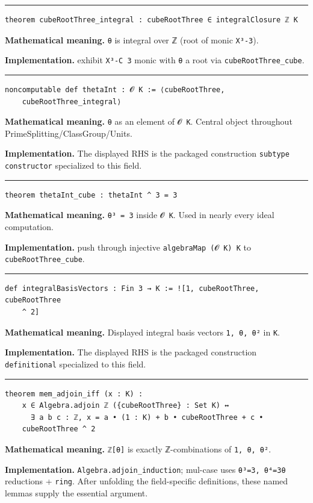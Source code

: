 \documentclass[UTF8,a4paper,11pt,fontset=fandol]{ctexart}
\theoremstyle{definition}
\newcommand{\statementsep}{\par\medskip\hrule\medskip}
\begin{document}
\statementsep
\begin{verbatim}
theorem cubeRootThree_integral : cubeRootThree ∈ integralClosure ℤ K
\end{verbatim}
\noindent\textbf{Mathematical meaning.} \texttt{θ} is integral over ℤ (root of monic \texttt{X³-3}).\par
\noindent\textbf{Implementation.} exhibit \texttt{X³-C 3} monic with \texttt{θ} a root via \texttt{cubeRootThree\_\allowbreak{}cube}.\par
\statementsep
\begin{verbatim}
noncomputable def thetaInt : 𝓞 K := ⟨cubeRootThree,
    cubeRootThree_integral⟩
\end{verbatim}
\noindent\textbf{Mathematical meaning.} \texttt{θ} as an element of \texttt{𝓞 K}. Central object throughout PrimeSplitting/ClassGroup/Units.\par
\noindent\textbf{Implementation.} The displayed RHS is the packaged construction \texttt{subtype constructor} specialized to this field.\par
\statementsep
\begin{verbatim}
theorem thetaInt_cube : thetaInt ^ 3 = 3
\end{verbatim}
\noindent\textbf{Mathematical meaning.} \texttt{θ³ = 3} inside \texttt{𝓞 K}. Used in nearly every ideal computation.\par
\noindent\textbf{Implementation.} push through injective \texttt{algebraMap (𝓞 K) K} to \texttt{cubeRootThree\_\allowbreak{}cube}.\par
\statementsep
\begin{verbatim}
def integralBasisVectors : Fin 3 → K := ![1, cubeRootThree, cubeRootThree
    ^ 2]
\end{verbatim}
\noindent\textbf{Mathematical meaning.} Displayed integral basis vectors \texttt{1, θ, θ²} in \texttt{K}.\par
\noindent\textbf{Implementation.} The displayed RHS is the packaged construction \texttt{definitional} specialized to this field.\par
\statementsep
\begin{verbatim}
theorem mem_adjoin_iff (x : K) :
    x ∈ Algebra.adjoin ℤ ({cubeRootThree} : Set K) ↔
      ∃ a b c : ℤ, x = a • (1 : K) + b • cubeRootThree + c •
    cubeRootThree ^ 2
\end{verbatim}
\noindent\textbf{Mathematical meaning.} \texttt{ℤ[θ]} is exactly ℤ-combinations of \texttt{1, θ, θ²}.\par
\noindent\textbf{Implementation.} \texttt{Algebra.\allowbreak{}adjoin\_\allowbreak{}induction}; mul-case uses \texttt{θ³=3, θ⁴=3θ} reductions + \texttt{ring}. After unfolding the field-specific definitions, these named lemmas supply the essential argument.\par
\end{document}
